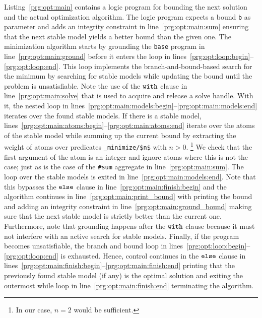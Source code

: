 

Listing~\ref{prg:opt:main} contains a logic program for bounding the next solution and the actual optimization algorithm.
%
The logic program expects a bound \lstinline{b} as parameter and adds an integrity constraint in line~\ref{prg:opt:main:sum} 
ensuring that the next stable model yields a better bound than the given one.
%
The minimization algorithm starts by grounding the \lstinline{base} program in line~\ref{prg:opt:main:ground}
before it enters the loop in lines~\ref{prg:opt:loop:begin}--\ref{prg:opt:loop:end}.
This loop implements the branch-and-bound-based search for the minimum
by searching for stable models while updating the bound until the problem is unsatisfiable.
%
Note the use of the $\texttt{with}$ clause in line~\ref{prg:opt:main:solve} that is used to acquire and release a solve handle.
With it,
the nested loop in lines~\ref{prg:opt:main:models:begin}--\ref{prg:opt:main:models:end} iterates over the found stable models.
%
If there is a stable model, lines~\ref{prg:opt:main:atoms:begin}--\ref{prg:opt:main:atoms:end} iterate over the atoms of the stable model
while summing up the current bound by extracting the weight of atoms over predicates \lstinline[mathescape=true]{_minimize/$n$} with $n>0$.%
\footnote{In our case, $n=2$ would be sufficient.}
%
We check that the first argument of the atom is an integer and ignore atoms where this is not the case; 
just as is the case of the \lstinline{#sum} aggregate in line~\ref{prg:opt:main:sum}.
%
The loop over the stable models is exited in line~\ref{prg:opt:main:models:end}.
%
Note that this bypasses the $\texttt{else}$ clause in line~\ref{prg:opt:main:finish:begin}
and the algorithm continues in line~\ref{prg:opt:main:print_bound} 
with printing the bound and adding an integrity constraint in line~\ref{prg:opt:main:ground_bound}
making sure that the next stable model is strictly better than the current one.
%
Furthermore, note that grounding happens after the $\texttt{with}$ clause because it must not interfere with an active search for stable models.
%
Finally,
if the program becomes unsatisfiable, the branch and bound loop in lines~\ref{prg:opt:loop:begin}--\ref{prg:opt:loop:end} is exhausted.
Hence, control continues in the $\texttt{else}$ clause in lines~\ref{prg:opt:main:finish:begin}--\ref{prg:opt:main:finish:end} printing that the previously found stable model (if any) is the optimal solution and exiting the outermost while loop in line~\ref{prg:opt:main:finish:end} terminating the algorithm.

